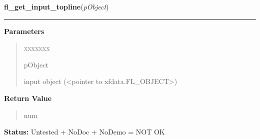 \hspace{.8\funcindent}\begin{boxedminipage}{\funcwidth}

    \raggedright \textbf{fl\_get\_input\_topline}(\textit{pObject})

    \vspace{-1.5ex}

    \rule{\textwidth}{0.5\fboxrule}
\setlength{\parskip}{2ex}
\setlength{\parskip}{1ex}
      \textbf{Parameters}
      \vspace{-1ex}

      \begin{quote}
        \begin{Ventry}{xxxxxxx}

          \item[pObject]

          input object ({\textless}pointer to 
          xfdata.FL\_OBJECT{\textgreater})

        \end{Ventry}

      \end{quote}

      \textbf{Return Value}
    \vspace{-1ex}

      \begin{quote}
      num

      \end{quote}

\textbf{Status:} Untested + NoDoc + NoDemo = NOT OK



    \end{boxedminipage}

    \label{xformslib:library:fl_get_input_screenlines}

    \vspace{0.5ex}

